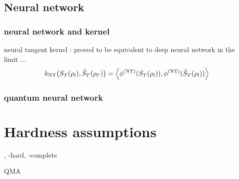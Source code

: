 \subsection{Neural network}\label{sec:neural_network}
\subsubsection{neural network and kernel}
\begin{definition}\label{def:neural_tangent_kernel}
	neural tangent kernel \cite{jacotNeuralTangentKernel2020}: proved to be equivalent to deep neural network \cite{gaoEfficientRepresentationQuantum2017} in the limit ...
	\begin{equation}
		k_{\textup{NT}} \qty(S_T(\rho_l),\tilde{S}_T(\rho_{l'}))
		=
		\expval{
			\phi^{(\textup{NT})}(S_T(\rho_l)),
			\phi^{(\textup{NT})}(\tilde{S}_T(\rho_l))
		}
	\end{equation}
\end{definition}



\subsubsection{quantum neural network}\label{sec:quantum_neural_network}

\section{Hardness assumptions}
\begin{definition}[\NP]\label{def:np}
	\NP, \NP-hard, \NP-complete
\end{definition}
\begin{definition}[\sharpP]\label{def:sharpp}
	\sharpP
\end{definition}
\begin{definition}[QMA]\label{def:qma}
	QMA
\end{definition}
\begin{definition}[\BPP]\label{def:bpp}
	\BPP
\end{definition}
\begin{definition}[\BQP]\label{def:bqp}
	\BQP
\end{definition}